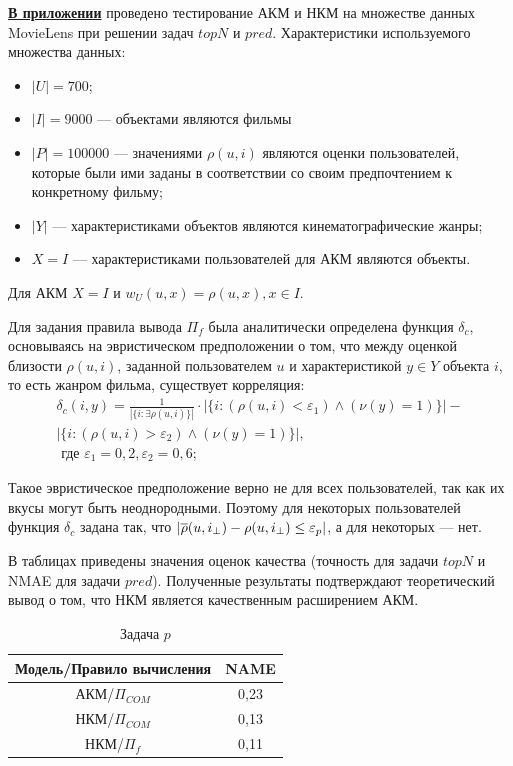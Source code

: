 {\underline {\bf В приложении}} проведено тестирование АКМ и НКМ на множестве данных MovieLens
при решении задач $topN$ и $pred$.
Характеристики используемого множества данных:
\begin{itemize}
	\item $|U| = 700$;
	\item $|I| = 9000$ --- объектами являются фильмы
	\item $|P| = 100 000$ --- значениями $\rho(u, i)$ являются оценки
		пользователей, которые были ими заданы в соответствии со своим
		предпочтением к конкретному фильму;
	\item $|Y|$ --- характеристиками объектов являются кинематографические
		жанры;
	\item $X = I$ --- характеристиками пользователей для АКМ являются объекты.
\end{itemize}

Для АКМ $X = I$ и $w_U(u, x) = \rho(u,x), x \in I$.

Для задания правила вывода $\Pi_f$ была аналитически определена
функция $\delta_c$, основываясь на эвристическом предположении о том,
что между оценкой близости $\rho(u, i)$, заданной пользователем $u$
и характеристикой $y \in Y$ объекта $i$,
то есть жанром фильма, существует корреляция:
\begin{multline}
	\delta_c(i, y) = \frac{1}{|\{i: \exists \rho(u,i)\}|}
	\cdot
	|\{ i : (\rho(u, i) < \varepsilon_1) \wedge (\nu(y) = 1)\}| -\\
	|\{ i : (\rho(u, i) > \varepsilon_2) \wedge (\nu(y) = 1)\}|, \\
	\text{ где }
	\varepsilon_1 = 0,2, \varepsilon_2 = 0,6;
\end{multline}

Такое эвристическое предположение верно не для всех пользователей, так как
их вкусы могут быть неоднородными. Поэтому для некоторых пользователей функция
$\delta_c$ задана так, что
$|\overline{\rho}(u, i_{\bot}) - \rho(u, i_{\bot}) \le \varepsilon_p|$,
а для некоторых --- нет.

В таблицах приведены значения оценок качества (точность для задачи $topN$ и NMAE для задачи $pred$).
Полученные результаты подтверждают теоретический вывод о том, что НКМ является качественным расширением АКМ.

\begin{table}[htb]
	\caption{Задача $p$}
  \begin{center}
	\label{table:p}
	\begin{tabular}{|c|c|}
	  \hline
		Модель/Правило вычисления & NAME \\ \hline
		АКМ/$\Pi_{COM}$&0,23 \\ \hline
		НКМ/$\Pi_{COM}$&0,13 \\ \hline
		НКМ/$\Pi_{f}$&0,11 \\ \hline
	\end{tabular}
  \end{center}
\end{table}

